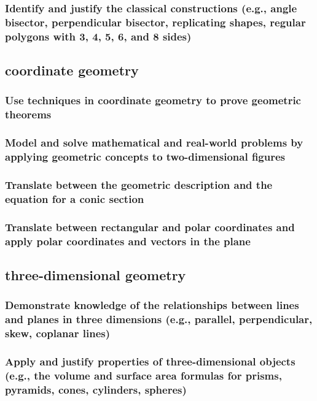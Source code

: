 \documentclass[11pt]{article}
\begin{document}
\subsubsection{Identify and justify the classical constructions (e.g., angle bisector, perpendicular bisector, replicating shapes, regular polygons with 3, 4, 5, 6, and 8 sides)}
\label{sec:orgb7251f6}
\subsection{coordinate geometry}
\label{sec:orgc930620}
\subsubsection{Use techniques in coordinate geometry to prove geometric theorems}
\label{sec:org1041cb5}
\subsubsection{Model and solve mathematical and real-world problems by applying geometric concepts to two-dimensional figures}
\label{sec:org174180b}
\subsubsection{Translate between the geometric description and the equation for a conic section}
\label{sec:orgd1ed86d}
\subsubsection{Translate between rectangular and polar coordinates and apply polar coordinates and vectors in the plane}
\label{sec:org0bb3ec7}
\subsection{three-dimensional geometry}
\label{sec:orgd408f49}
\subsubsection{Demonstrate knowledge of the relationships between lines and planes in three dimensions (e.g., parallel, perpendicular, skew, coplanar lines)}
\label{sec:orgdd0ca14}
\subsubsection{Apply and justify properties of three-dimensional objects (e.g., the volume and surface area formulas for prisms, pyramids, cones, cylinders, spheres)}
\label{sec:orgda260d7}
\end{document}
